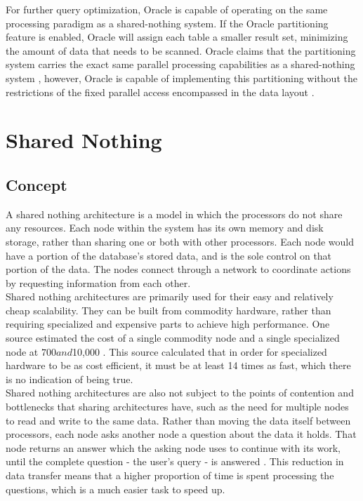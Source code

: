 \documentclass[onecolumn, draftclsnofoot,10pt, compsoc]{IEEEtran}
\begin{document}
\indent For further query optimization, Oracle is capable of operating on the same processing paradigm as a shared-nothing system. If the Oracle partitioning feature is enabled, Oracle will assign each table a smaller result set, minimizing the amount of data that needs to be scanned. Oracle claims that the partitioning system carries the exact same parallel processing capabilities as a shared-nothing system \cite{OraclePEwODF}, however, Oracle is capable of implementing this partitioning without the restrictions of the fixed parallel access encompassed in the data layout \cite{OraclePEwODF}.  \\


	\section{Shared Nothing}
	
    \subsection{Concept}
    \indent A shared nothing architecture is a model in which the processors do not share any resources. Each node within the system has its own memory and disk storage, rather than sharing one or both with other processors. Each node would have a portion of the database’s stored data, and is the sole control on that portion of the data. The nodes connect through a network to coordinate actions by requesting information from each other. \\

\indent Shared nothing architectures are primarily used for their easy and relatively cheap scalability. They can be built from commodity hardware, rather than requiring specialized and expensive parts to achieve high performance. One source estimated the cost of a single commodity node and a single specialized node at $700 and $10,000 \cite{HiPerf}. This source calculated that in order for specialized hardware to be as cost efficient, it must be at least 14 times as fast, which there is no indication of being true. \\

\indent Shared nothing architectures are also not subject to the points of contention and bottlenecks that sharing architectures have, such as the need for multiple nodes to read and write to the same data. Rather than moving the data itself between processors, each node asks another node a question about the data it holds. That node returns an answer which the asking node uses to continue with its work, until the complete question - the user’s query - is answered \cite{DeWittFuture}. This reduction in data transfer means that a higher proportion of time is spent processing the questions, which is a much easier task to speed up. \\
\end{document}
